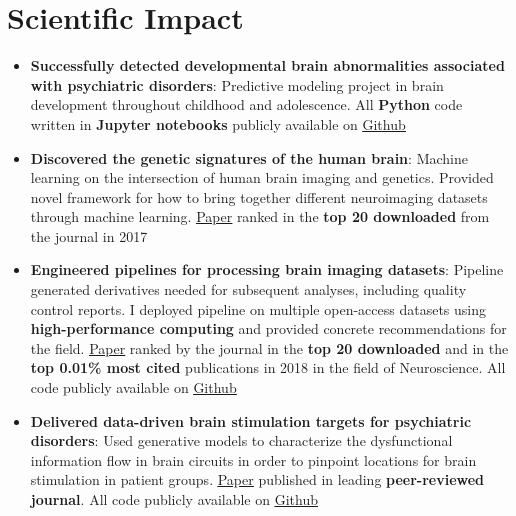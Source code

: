 \documentclass[letterpaper,10pt]{article}
\newcommand{\resumeItem}[2]{
  \item\small{
    \textbf{#1}{: #2 \vspace{-2pt}}
  }
}
\newcommand{\resumeSubItem}[2]{\resumeItem{#1}{#2}\vspace{-4pt}}
\newcommand{\resumeSubHeadingListStart}{\begin{itemize}[leftmargin=*]}
\newcommand{\resumeSubHeadingListEnd}{\end{itemize}}
\begin{document}
\section{Scientific Impact}
  \resumeSubHeadingListStart
    \resumeSubItem{Successfully detected developmental brain abnormalities associated with psychiatric disorders}
      {Predictive modeling project in brain development throughout childhood and adolescence. All \textbf{Python} code written in \textbf{Jupyter notebooks} publicly available on \href{https://github.com/lindenmp/NormativeNeuroDev_CrossSec}{\underline{Github}}}
      \newline
    \resumeSubItem{Discovered the genetic signatures of the human brain}
      {Machine learning on the intersection of human brain imaging and genetics. Provided novel framework for how to bring together different neuroimaging datasets through machine learning. \href{https://onlinelibrary.wiley.com/doi/full/10.1111/gbb.12386}{\underline{Paper}} ranked in the \textbf{top 20 downloaded} from the journal in 2017}
      \newline
    \resumeSubItem{Engineered pipelines for processing brain imaging datasets}
      {Pipeline generated derivatives needed for subsequent analyses, including quality control reports. I deployed pipeline on multiple open-access datasets using \textbf{high-performance computing} and provided concrete recommendations for the field. \href{https://www.sciencedirect.com/science/article/pii/S1053811917310972}{\underline{Paper}} ranked by the journal in the \textbf{top 20 downloaded} and in the \textbf{top 0.01\% most cited} publications in 2018 in the field of Neuroscience. All code publicly available on \href{https://github.com/lindenmp/rs-fMRI}{\underline{Github}}}
      \newline
    \resumeSubItem{Delivered data-driven brain stimulation targets for psychiatric disorders}
      {Used generative models to characterize the dysfunctional information flow in brain circuits in order to pinpoint locations for brain stimulation in patient groups. \href{https://www.sciencedirect.com/science/article/pii/S1053811919306585}{\underline{Paper}} published in leading \textbf{peer-reviewed journal}. All code publicly available on \href{https://github.com/lindenmp/rs-fMRI/tree/master/stats/spDCM}{\underline{Github}}}
  \resumeSubHeadingListEnd
\end{document}
